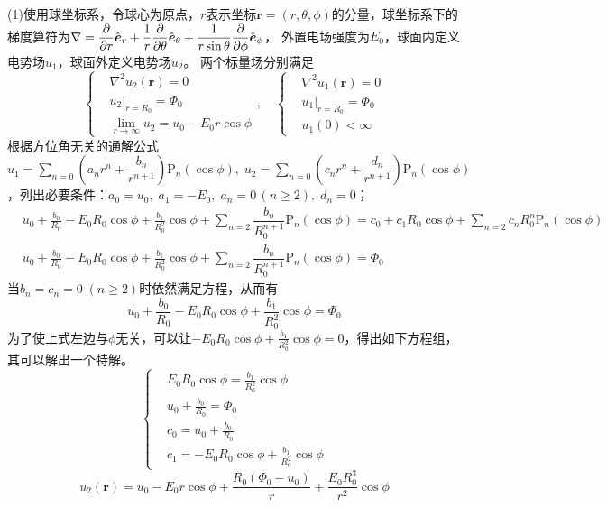 \documentclass{mynote}
\newcommand{\lP}{\mathrm{P}}
\begin{document}
\begin{solution}
    (1)使用球坐标系，令球心为原点，$r$表示坐标$\bm{r} = (r,\theta,\phi)$的分量，球坐标系下的梯度算符为$\nabla = \dfrac{\partial }{\partial r} \hat{\boldsymbol{e}}_r + \dfrac{1}{r}\dfrac{\partial }{\partial \theta} \hat{\boldsymbol{e}}_{\theta} + \dfrac{1}{r\sin \theta} \dfrac{\partial }{\partial \phi} \hat{\boldsymbol{e}}_{\phi}$， 外置电场强度为$E_0$，球面内定义电势场$u_1$，球面外定义电势场$u_2$。
    两个标量场分别满足
    \[
    \left\{
        \begin{aligned}
            & \nabla^2 u_2(\bm{r}) = 0\\
            & u_2 |_{r=R_0} = \varPhi_0 \\
            & \lim_{r\to \infty} u_2 = u_0 - E_0 r \cos \phi
        \end{aligned} 
    \right. ,\quad
    \left\{
        \begin{aligned}
            & \nabla^2 u_1(\bm{r}) = 0\\
            & u_1 |_{r=R_0} = \varPhi_0 \\
            & u_1(0) < \infty
        \end{aligned} 
    \right.   
    \]
    根据方位角无关的通解公式$u_1 = \displaystyle\sum_{n=0} \left( a_n r^n + \dfrac{b_n}{r^{n+1}} \right) \lP_n(\cos \phi),\; u_2 = \displaystyle\sum_{n=0} \left( c_n r^n + \dfrac{d_n}{r^{n+1}} \right) \lP_n(\cos \phi)$，列出必要条件：$a_0 = u_0,\; a_1 = -E_0,\; a_n = 0\, (n \geq 2),\; d_n = 0$；
    \begin{align*}
        & u_0 + \frac{b_0}{R_0} - E_0 R_0 \cos \phi + \frac{b_1}{R_0^2} \cos \phi + \sum_{n=2} \dfrac{b_n}{R_0^{n+1}} \lP_n(\cos \phi) = c_0 + c_1 R_0 \cos \phi + \sum_{n=2} c_n R_0^n \lP_n(\cos \phi) \\
        & u_0 + \frac{b_0}{R_0} - E_0 R_0 \cos \phi + \frac{b_1}{R_0^2} \cos \phi + \sum_{n=2} \dfrac{b_n}{R_0^{n+1}} \lP_n(\cos \phi) = \varPhi_0
    \end{align*}
    当$b_n = c_n = 0\; (n\geq 2)$时依然满足方程，从而有
    \[
        u_0 + \frac{b_0}{R_0} - E_0 R_0 \cos \phi + \frac{b_1}{R_0^2} \cos \phi = \varPhi_0
    \]
    为了使上式左边与$\phi$无关，可以让$ - E_0 R_0 \cos \phi + \frac{b_1}{R_0^2} \cos \phi = 0$，得出如下方程组，其可以解出一个特解。
    \[
    \left\{
        \begin{aligned}
            & E_0 R_0 \cos \phi = \frac{b_1}{R_0^2} \cos \phi \\
            & u_0 + \frac{b_0}{R_0} = \varPhi_0 \\
            & c_0 = u_0 + \frac{b_0}{R_0} \\
            & c_1 = - E_0 R_0 \cos \phi + \frac{b_1}{R_0^2} \cos \phi
        \end{aligned} 
    \right.    
    \]
    \[
    u_2(\bm{r}) = u_0 - E_0 r \cos \phi + \frac{R_0 (\varPhi_0 - u_0)}{r} + \frac{E_0 R_0^3}{r^2} \cos \phi
    \]


\end{solution}
\end{document}
